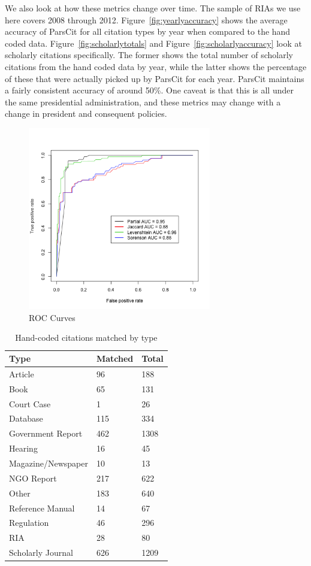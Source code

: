 \documentclass[12pt]{article}
\begin{document}
We also look at how these metrics change over time. The sample of RIAs we use here covers 2008 through 2012. Figure~\ref{fig:yearlyaccuracy} shows the average accuracy of ParsCit for all citation types by year when compared to the hand coded data. Figure~\ref{fig:scholarlytotals} and Figure~\ref{fig:scholarlyaccuracy} look at scholarly citations specifically. The former shows the total number of scholarly citations from the hand coded data by year, while the latter shows the percentage of these that were actually picked up by ParsCit for each year. ParsCit maintains a fairly consistent accuracy of around 50\%. One caveat is that this is all under the same presidential administration, and these metrics may change with a change in president and consequent policies.

\begin{figure}
\begin{center}
\includegraphics[height=8cm]{roc_curves.png}
\caption{ROC Curves}
\label{fig:roc}
\end{center}
\end{figure}

\begin{table}[ht]
\centering
\caption{Hand-coded citations matched by type}\label{tab:focalhand}
\begin{tabular}{lll}
  \hline
  \hline
 Type & Matched & Total\\
 \hline
Article & 96 & 188 \\
Book & 65 & 131\\
Court Case & 1 & 26\\
Database & 115 & 334\\
Government Report & 462 & 1308\\
Hearing & 16 & 45\\
Magazine/Newspaper & 10 & 13\\
NGO Report & 217 & 622 \\
Other & 183 & 640\\
Reference Manual & 14 & 67\\
Regulation & 46 & 296\\
RIA & 28 & 80\\
Scholarly Journal & 626 & 1209\\
  \hline
  \hline
\end{tabular}
\end{table}
\end{document}
